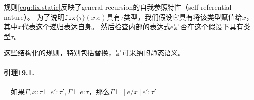 规则\ref{equ:fix.static}反映了\gls{general recursion}的自我参照特性（self-referential nature）。
为了说明\(\mathtt{fix}\{\tau\}(x.e)\)具有\(\tau\)类型，我们假设它具有将该类型赋值给\(x\)，其中\(x\)代表这个递归表达自身。
然后检查内部的表达式\(e\)是否在这个假设下具有类型\(\tau\)。

这些结构化的规则，特别包括替换，是可采纳的静态语义。

\paragraph{引理19.1.}　如果\(\Gamma, x: \tau \vdash e': \tau', \Gamma \vdash e: \tau\)，那么\(\Gamma \vdash [e/x]e': \tau'\)
